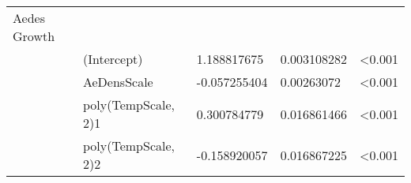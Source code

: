 \begin{table}[]
\begin{tabular}{lllll}
\hline
Aedes Growth    &                               &                         &                     &                        \\
                & (Intercept)                   & 1.188817675             & 0.003108282         & \textless0.001         \\
                & AeDensScale                   & -0.057255404            & 0.00263072          & \textless0.001         \\
                & poly(TempScale, 2)1           & 0.300784779             & 0.016861466         & \textless0.001         \\
                & poly(TempScale, 2)2           & -0.158920057            & 0.016867225         & \textless0.001
\end{tabular}
\end{table}

